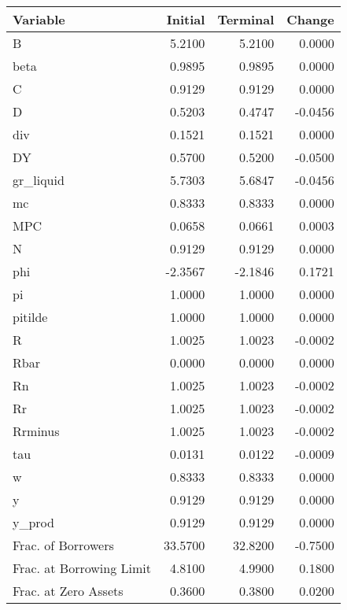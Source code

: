 \begin{table}
\centering
\label{tab:stst_comparison_low_beta_limit_permanent}
\begin{tabular}{lrrr}
\toprule
                Variable &  Initial &  Terminal &  Change \\
\midrule
                       B &   5.2100 &    5.2100 &  0.0000 \\
                    beta &   0.9895 &    0.9895 &  0.0000 \\
                       C &   0.9129 &    0.9129 &  0.0000 \\
                       D &   0.5203 &    0.4747 & -0.0456 \\
                     div &   0.1521 &    0.1521 &  0.0000 \\
                      DY &   0.5700 &    0.5200 & -0.0500 \\
               gr\_liquid &   5.7303 &    5.6847 & -0.0456 \\
                      mc &   0.8333 &    0.8333 &  0.0000 \\
                     MPC &   0.0658 &    0.0661 &  0.0003 \\
                       N &   0.9129 &    0.9129 &  0.0000 \\
                     phi &  -2.3567 &   -2.1846 &  0.1721 \\
                      pi &   1.0000 &    1.0000 &  0.0000 \\
                 pitilde &   1.0000 &    1.0000 &  0.0000 \\
                       R &   1.0025 &    1.0023 & -0.0002 \\
                    Rbar &   0.0000 &    0.0000 &  0.0000 \\
                      Rn &   1.0025 &    1.0023 & -0.0002 \\
                      Rr &   1.0025 &    1.0023 & -0.0002 \\
                 Rrminus &   1.0025 &    1.0023 & -0.0002 \\
                     tau &   0.0131 &    0.0122 & -0.0009 \\
                       w &   0.8333 &    0.8333 &  0.0000 \\
                       y &   0.9129 &    0.9129 &  0.0000 \\
                  y\_prod &   0.9129 &    0.9129 &  0.0000 \\
      Frac. of Borrowers &  33.5700 &   32.8200 & -0.7500 \\
Frac. at Borrowing Limit &   4.8100 &    4.9900 &  0.1800 \\
    Frac. at Zero Assets &   0.3600 &    0.3800 &  0.0200 \\
\bottomrule
\end{tabular}
\end{table}
